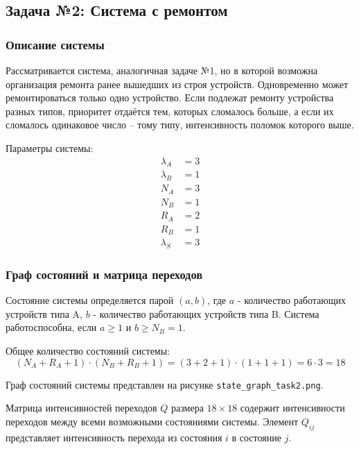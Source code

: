 \subsection{Задача №2: Система с ремонтом}\label{sec:Second}

\subsubsection{Описание системы}

Рассматривается система, аналогичная задаче №1, но в которой возможна организация ремонта ранее вышедших из строя устройств. Одновременно может ремонтироваться только одно устройство. Если подлежат ремонту устройства разных типов, приоритет отдаётся тем, которых сломалось больше, а если их сломалось одинаковое число – тому типу, интенсивность поломок которого выше.

Параметры системы:
\begin{align}
\lambda_A &= 3 \\
\lambda_B &= 1 \\
N_A &= 3 \\
N_B &= 1 \\
R_A &= 2 \\
R_B &= 1 \\
\lambda_S &= 3
\end{align}

\subsubsection{Граф состояний и матрица переходов}

Состояние системы определяется парой $(a, b)$, где $a$ - количество работающих устройств типа A, $b$ - количество работающих устройств типа B. Система работоспособна, если $a \geq 1$ и $b \geq N_B = 1$.

Общее количество состояний системы:
\begin{equation}
(N_A + R_A + 1) \cdot (N_B + R_B + 1) = (3 + 2 + 1) \cdot (1 + 1 + 1) = 6 \cdot 3 = 18
\end{equation}

Граф состояний системы представлен на рисунке \texttt{state\_graph\_task2.png}.

Матрица интенсивностей переходов $Q$ размера $18 \times 18$ содержит интенсивности переходов между всеми возможными состояниями системы. Элемент $Q_{ij}$ представляет интенсивность перехода из состояния $i$ в состояние $j$.

